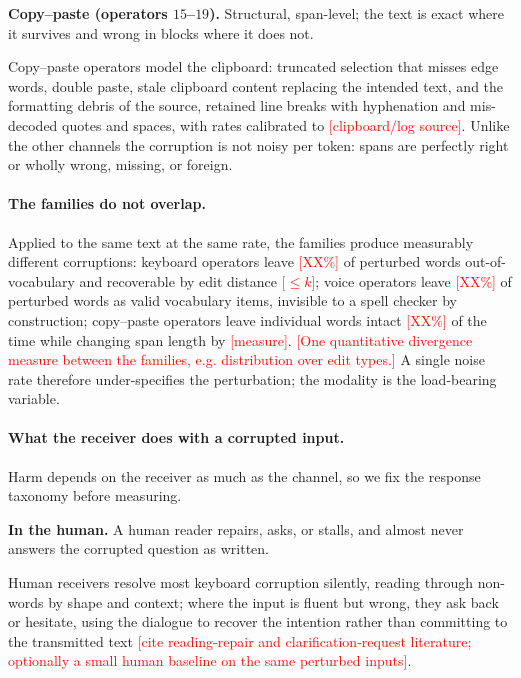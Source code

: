 \documentclass[11pt]{article}
\newcommand{\todo}[1]{\textcolor{red}{[#1]}}
\begin{document}
\begin{modbox}
\textbf{Copy--paste (operators $15$--$19$).} Structural, span-level; the text is exact where it
survives and wrong in blocks where it does not.
\end{modbox}

Copy--paste operators model the clipboard: truncated selection that misses edge words, double
paste, stale clipboard content replacing the intended text, and the formatting debris of the
source, retained line breaks with hyphenation and mis-decoded quotes and spaces, with rates
calibrated to \todo{clipboard/log source}. Unlike the other channels the corruption is not noisy
per token: spans are perfectly right or wholly wrong, missing, or foreign.

\paragraph{The families do not overlap.} Applied to the same text at the same rate, the families
produce measurably different corruptions: keyboard operators leave \todo{XX\%} of perturbed words
out-of-vocabulary and recoverable by edit distance \todo{$\le k$}; voice operators leave
\todo{XX\%} of perturbed words as valid vocabulary items, invisible to a spell checker by
construction; copy--paste operators leave individual words intact \todo{XX\%} of the time while
changing span length by \todo{measure}. \todo{One quantitative divergence measure between the
families, e.g. distribution over edit types.} A single noise rate therefore under-specifies the
perturbation; the modality is the load-bearing variable.

\paragraph{What the receiver does with a corrupted input.} Harm depends on the receiver as much
as the channel, so we fix the response taxonomy before measuring.

\begin{modbox}
\textbf{In the human.} A human reader repairs, asks, or stalls, and almost never answers the
corrupted question as written.
\end{modbox}

Human receivers resolve most keyboard corruption silently, reading through non-words by shape and
context; where the input is fluent but wrong, they ask back or hesitate, using the dialogue to
recover the intention rather than committing to the transmitted text \todo{cite reading-repair
and clarification-request literature; optionally a small human baseline on the same perturbed
inputs}.
\end{document}
